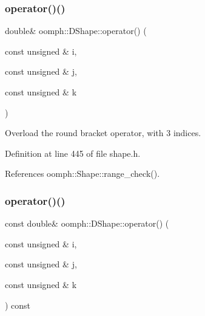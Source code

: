 \mbox{\label{classoomph_1_1DShape_ae9b6e45963e0c5bfb9df09e7acaf843b}} 
\subsubsection{\texorpdfstring{operator()()}{operator()()}\hspace{0.1cm}{\footnotesize\ttfamily [3/4]}}
{\footnotesize\ttfamily double\& oomph\+::\+D\+Shape\+::operator() (\begin{DoxyParamCaption}\item[{const unsigned \&}]{i,  }\item[{const unsigned \&}]{j,  }\item[{const unsigned \&}]{k }\end{DoxyParamCaption})\hspace{0.3cm}{\ttfamily [inline]}}



Overload the round bracket operator, with 3 indices. 



Definition at line 445 of file shape.\+h.



References oomph\+::\+Shape\+::range\+\_\+check().

\mbox{\label{classoomph_1_1DShape_a6701a34fae38c907f2d57a292f5f6cf7}} 
\subsubsection{\texorpdfstring{operator()()}{operator()()}\hspace{0.1cm}{\footnotesize\ttfamily [4/4]}}
{\footnotesize\ttfamily const double\& oomph\+::\+D\+Shape\+::operator() (\begin{DoxyParamCaption}\item[{const unsigned \&}]{i,  }\item[{const unsigned \&}]{j,  }\item[{const unsigned \&}]{k }\end{DoxyParamCaption}) const\hspace{0.3cm}{\ttfamily [inline]}}



